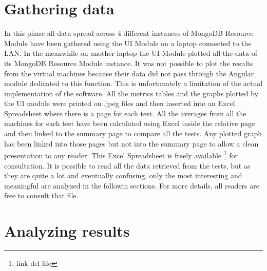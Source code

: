 \section{Gathering data}
\label{sec:3}
In this phase all data spread across 4 different instances of MongoDB Resource Module have been gathered using the UI Module on a laptop connected to the LAN.
In the meanwhile on another laptop the UI Module plotted all the data of its MongoDB Resource Module instance. It was not possible to plot the results from the virtual machines because their data did not pass through the Angular module dedicated to this function. This is unfortunately a limitation of the actual implementation of the software.
All the metrics tables and the graphs plotted by the UI module were printed on .jpeg files and then inserted into an Excel Spreadsheet where there is a page for each test. All the averages from all the machines for each test have been calculated using Excel inside the relative page and then linked to the summary page to compare all the tests. Any plotted graph has been linked into those pages but not into the summary page to allow a clean presentation to any reader.
This Excel Spreadsheet is freely available \footnote{link del file} for consultation. 
It is possible to read all the data retrieved from the tests, but as they are quite a lot and eventually confusing, only the most interesting and meaningful are analyzed in the followin sections. For more details, all readers are free to consult that file.

\section{Analyzing results}
\label{sec:4}

